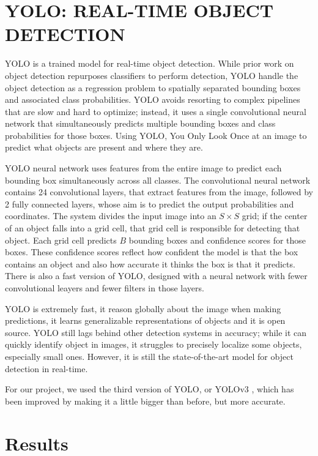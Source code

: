 \documentclass[letterpaper, 10 pt, conference]{ieeeconf}  %
\begin{document}
\section{YOLO: REAL-TIME OBJECT DETECTION}

YOLO \cite{DBLP:conf/cvpr/RedmonDGF16} is a trained model for real-time object detection. While prior work on object detection repurposes classifiers to perform detection, YOLO handle the object detection as a regression problem to spatially separated bounding boxes and associated class probabilities. YOLO avoids resorting to complex pipelines that are slow and hard to optimize; instead, it uses a single convolutional neural network that simultaneously predicts multiple bounding boxes and class probabilities for those boxes. Using YOLO, You Only Look Once at an image to predict what objects are present and where they are.

YOLO neural network uses features from the entire image to predict each bounding box simultaneously across all classes. The convolutional neural network contains 24 convolutional layers, that extract features from the image, followed by 2 fully connected layers, whose aim is to predict the output probabilities and coordinates. The system divides the input image into an $S \times S$ grid; if the center of an object falls into a grid cell, that grid cell is responsible for detecting that object. Each grid cell predicts $B$ bounding boxes and confidence scores for those boxes. These confidence scores reflect how confident the model is that the box contains an object and also how accurate it thinks the box is that it predicts. There is also a fast version of YOLO, designed with a neural network with fewer convolutional leayers and fewer filters in those layers.

YOLO is extremely fast, it reason globally about the image when making predictions, it learns generalizable representations of objects and it is open source. YOLO still lags behind other detection systems in accuracy; while it can quickly identify object in images, it struggles to precisely localize some objects, especially small ones. However, it is still the state-of-the-art model for object detection in real-time.

For our project, we used the third version of YOLO, or YOLOv3 \cite{Yolo3}, which has been improved by making it a little bigger than before, but more accurate.

\section{Results}
\end{document}
